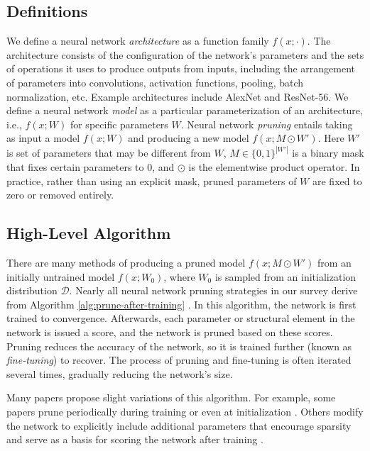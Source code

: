 \subsection{Definitions}

We define a neural network \emph{architecture} as a function family $f(x; \cdot)$.
The architecture consists of the configuration of the network's parameters and the sets of operations it uses to produce outputs from inputs, including the arrangement of parameters into convolutions, activation functions, pooling, batch normalization, etc.
Example architectures include AlexNet and ResNet-56.
We define a neural network \emph{model} as a particular parameterization of an architecture, i.e., $f(x; W)$ for specific parameters $W$.
Neural network \emph{pruning} entails taking as input a model $f(x; W)$ and producing a new model $f(x; M \odot W')$. Here $W'$ is set of parameters that may be different from $W$, $M \in \{0, 1\}^{|W'|}$ is a binary mask that fixes certain parameters to $0$, and $\odot$ is the elementwise product operator.
In practice, rather than using an explicit mask, pruned parameters of $W$ are fixed to zero or removed entirely.

\subsection{High-Level Algorithm}

There are many methods of producing a pruned model $f(x; M \odot W')$ from an initially untrained model $f(x; W_0)$, where $W_0$ is sampled from an initialization distribution $\mathcal{D}$.
Nearly all neural network pruning strategies in our survey derive from Algorithm \ref{alg:prune-after-training} \cite{learning-both}.
In this algorithm, the network is first trained to convergence.
Afterwards, each parameter or structural element in the network is issued a score, and the network is pruned based on these scores.
Pruning reduces the accuracy of the network, so it is trained further (known as \emph{fine-tuning}) to recover.
The process of pruning and fine-tuning is often iterated several times, gradually reducing the network's size.

Many papers propose slight variations of this algorithm.
For example, some papers prune periodically during training \cite{google-state-of-sparsity} or even at initialization \cite{snip}.
Others modify the network to explicitly include additional parameters that encourage sparsity and serve as a basis for scoring the network after training \cite{sparse-variational-dropout}.

